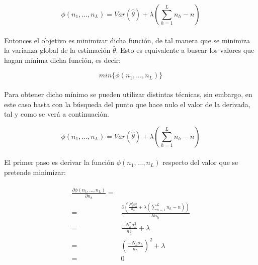 \documentclass{article}
\begin{document}
      \begin{equation}
        \phi(n_1, ..., n_L) = Var(\widehat{\theta}) + \lambda \left( \sum_{h=1}^L n_h - n\right)
      \end{equation}

      \paragraph{}

      Entonces el objetivo es minimizar dicha función, de tal manera que se minimiza la varianza global de la estimación $\widehat{\theta}$. Esto es equivalente a buscar los valores que hagan mínima dicha función, es decir:

      \begin{equation}
        min\{\phi(n_1, ..., n_L)\}
      \end{equation}

      \paragraph{}
      Para obtener dicho mínimo se pueden utilizar distintas técnicas, sin embargo, en este caso basta con la búsqueda del punto que hace nulo el valor de la derivada, tal y como se verá a continuación.

      \begin{equation}
        \phi(n_1, ..., n_L) = Var(\widehat{\theta}) + \lambda \left( \sum_{h=1}^L n_h - n\right)
      \end{equation}


      \paragraph{}
      El primer paso es derivar la función $\phi(n_1, ..., n_L)$ respecto del valor que se pretende minimizar:

      \begin{align}
      \label{eq:derivate_1}
        \begin{split}
          \frac{\partial \phi(n_1, ..., n_L)}{\partial n_h} =& \\
          =& \frac{\partial\left( \frac{N_h^2 \sigma_h^{2}}{n_h}
          + \lambda \left( \sum_{h=1}^L n_h - n\right)\right) }{\partial n_h} \\
          =& \frac{-N_h^2 \sigma_h^{2}}{n_h^2} +\lambda \\
          =& \left(\frac{-N_h \sigma_h}{n_h}\right)^2 +\lambda \\
          =& 0
        \end{split}
      \end{align}
\end{document}
